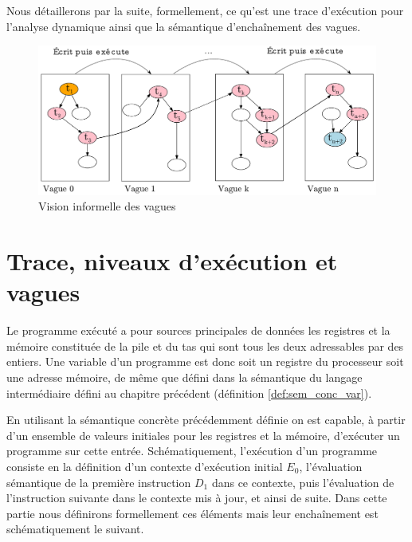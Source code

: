 Nous détaillerons par la suite, formellement, ce qu'est une trace d'exécution pour l'analyse dynamique ainsi que la sémantique d'enchaînement des vagues.

\begin{figure}
 \includegraphics[width=1.0\textwidth]{supports/automodification/phases2_final_test.pdf}
 \vspace{0.2cm}
 \caption{Vision informelle des vagues}
 \label{fig:vagues_visuel}
\end{figure}
% 
\section{Trace, niveaux d'exécution et vagues}
Le programme exécuté a pour sources principales de données les registres et la mémoire constituée de la pile et du tas qui sont tous les deux adressables par des entiers. Une variable d'un programme est donc soit un registre du processeur soit une adresse mémoire, de même que défini dans la sémantique du langage intermédiaire défini au chapitre précédent (définition \ref{def:sem_conc_var}).

En utilisant la sémantique concrète précédemment définie on est capable, à partir d'un ensemble de valeurs initiales pour les registres et la mémoire, d'exécuter un programme sur cette entrée.
Schématiquement, l'exécution d'un programme consiste en la définition d'un contexte d'exécution initial $E_0$, l'évaluation sémantique de la première instruction $D_1$ dans ce contexte, puis l'évaluation de l'instruction suivante dans le contexte mis à jour, et ainsi de suite. Dans cette partie nous définirons formellement ces éléments mais leur enchaînement est schématiquement le suivant.

\begin{center}
\end{center}

